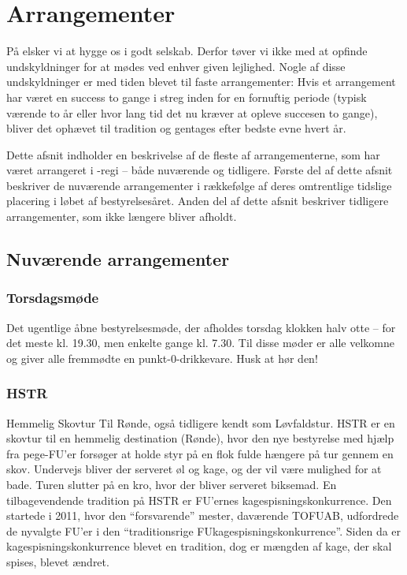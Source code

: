 \chapter{Arrangementer}

På \TKET elsker vi at hygge os i godt selskab. Derfor tøver vi ikke med at opfinde undskyldninger for at mødes ved enhver given lejlighed. Nogle af disse undskyldninger er med tiden blevet til faste arrangementer: Hvis et arrangement har været en success to gange i streg inden for en fornuftig periode (typisk værende to år eller hvor lang tid det nu kræver at opleve succesen to gange), bliver det ophævet til tradition og gentages efter bedste evne hvert år.

Dette afsnit indholder en beskrivelse af de fleste af arrangementerne, som har været arrangeret i \TK-regi -- både nuværende og tidligere. Første del af dette afsnit beskriver de nuværende arrangementer i rækkefølge af deres omtrentlige tidslige placering i løbet af bestyrelsesåret. Anden del af dette afsnit beskriver tidligere arrangementer, som ikke længere bliver afholdt.

\section{Nuværende arrangementer}
\vspace{-6pt}
\subsection{Torsdagsmøde}
Det ugentlige åbne bestyrelsesmøde, der afholdes torsdag klokken halv otte -- for det meste kl. 19.30, men enkelte gange kl. 7.30. Til disse møder er alle velkomne og \TKET giver alle fremmødte en punkt-0-drikkevare. Husk at hør den!
\vspace{-3pt}

\subsection{HSTR}
Hemmelig Skovtur Til Rønde, også tidligere kendt som Løvfaldstur. HSTR er en skovtur til en hemmelig destination (Rønde), hvor den nye bestyrelse med hjælp fra pege-FU'er forsøger at holde styr på en flok fulde hængere på tur gennem en skov. Undervejs bliver der serveret øl og kage, og der vil være mulighed for at bade. Turen slutter på en kro, hvor der bliver serveret biksemad. En tilbagevendende tradition på HSTR er FU'ernes kagespisningskonkurrence. Den startede i 2011, hvor den ``forsvarende'' mester, daværende TOFUAB, udfordrede de nyvalgte FU'er i den ``traditionsrige FUkagespisningskonkurrence''. Siden da er kagespisningskonkurrence blevet en tradition, dog er mængden af kage, der skal spises, blevet ændret.
\vspace{-3pt}

